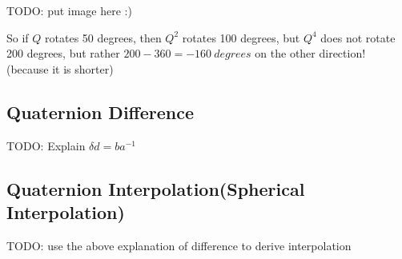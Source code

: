 TODO: put image here :)

So if $Q$ rotates 50 degrees, then $Q^2$ rotates 100 degrees, but $Q^4$ does not rotate 200 degrees, but rather $200 - 360 = -160~degrees$
on the other direction! (because it is shorter)

\subsection{Quaternion Difference}
TODO: Explain $\delta d = ba^{-1}$

\subsection{Quaternion Interpolation(Spherical Interpolation)}
TODO: use the above explanation of difference to derive interpolation
